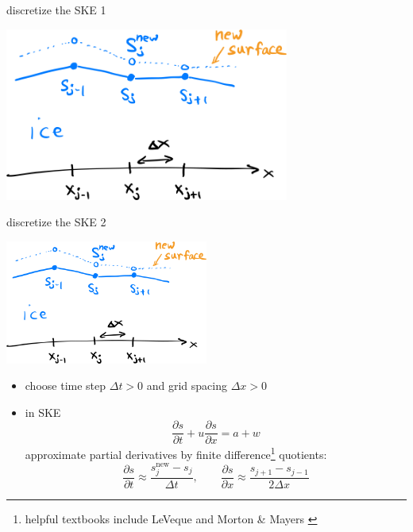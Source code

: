 \documentclass[10pt,dvipsnames]{beamer}
\newcommand{\snew}{s^{\text{new}}}
\begin{document}
\begin{frame}{discretize the SKE 1}

\begin{center}
\includegraphics[width=0.7\textwidth]{surfacenotation}
\end{center}
\end{frame}

\begin{frame}{discretize the SKE 2}
\begin{center}
\includegraphics[width=0.5\textwidth]{surfacenotation}
\end{center}

\begin{itemize}
\item choose time step $\Delta t>0$ and grid spacing $\Delta x>0$
\item in SKE
\begin{equation*}
\frac{\partial s}{\partial t} + u \frac{\partial s}{\partial x} = a + w
\end{equation*}
approximate partial derivatives by finite difference\footnote{helpful textbooks include LeVeque \cite{Leveque2007} and Morton \& Mayers \cite{MortonMayers2005}} quotients:
    $$\frac{\partial s}{\partial t} \approx \frac{\snew_j - s_j}{\Delta t}, \qquad \frac{\partial s}{\partial x} \approx \frac{s_{j+1} - s_{j-1}}{2\Delta x}$$
\phantom{foo}
\end{itemize}
\end{frame}
\end{document}
